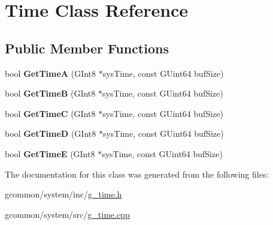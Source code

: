 \hypertarget{class_time}{\section{Time Class Reference}
\label{class_time}
}
\subsection*{Public Member Functions}
\begin{DoxyCompactItemize}
\item 
\hypertarget{class_time_aa06b280e9c1f7cd982edbfb0e4c35830}{bool {\bfseries Get\-Time\-A} (G\-Int8 $\ast$sys\-Time, const G\-Uint64 buf\-Size)}\label{class_time_aa06b280e9c1f7cd982edbfb0e4c35830}

\item 
\hypertarget{class_time_a98edd5c867e47b4b728daf38406d5ac0}{bool {\bfseries Get\-Time\-B} (G\-Int8 $\ast$sys\-Time, const G\-Uint64 buf\-Size)}\label{class_time_a98edd5c867e47b4b728daf38406d5ac0}

\item 
\hypertarget{class_time_a1d2c9a18bedb7afdddc0ff545e96cbca}{bool {\bfseries Get\-Time\-C} (G\-Int8 $\ast$sys\-Time, const G\-Uint64 buf\-Size)}\label{class_time_a1d2c9a18bedb7afdddc0ff545e96cbca}

\item 
\hypertarget{class_time_a33f77f2ca8aed600d54d1140f038e7d1}{bool {\bfseries Get\-Time\-D} (G\-Int8 $\ast$sys\-Time, const G\-Uint64 buf\-Size)}\label{class_time_a33f77f2ca8aed600d54d1140f038e7d1}

\item 
\hypertarget{class_time_a1234aecf26a1bc73ac8696746b29915e}{bool {\bfseries Get\-Time\-E} (G\-Int8 $\ast$sys\-Time, const G\-Uint64 buf\-Size)}\label{class_time_a1234aecf26a1bc73ac8696746b29915e}

\end{DoxyCompactItemize}


The documentation for this class was generated from the following files\-:\begin{DoxyCompactItemize}
\item 
gcommon/system/inc/\hyperlink{g__time_8h}{g\-\_\-time.\-h}\item 
gcommon/system/src/\hyperlink{g__time_8cpp}{g\-\_\-time.\-cpp}\end{DoxyCompactItemize}
